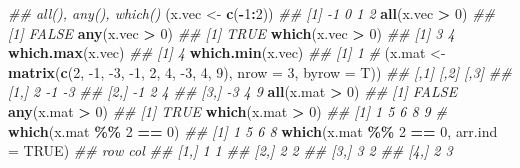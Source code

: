 \documentclass[
]{book}
\newenvironment{Shaded}{\begin{snugshade}}{\end{snugshade}}
\newcommand{\CommentTok}[1]{\textcolor[rgb]{0.56,0.35,0.01}{\textit{#1}}}
\newcommand{\DataTypeTok}[1]{\textcolor[rgb]{0.13,0.29,0.53}{#1}}
\newcommand{\DecValTok}[1]{\textcolor[rgb]{0.00,0.00,0.81}{#1}}
\newcommand{\KeywordTok}[1]{\textcolor[rgb]{0.13,0.29,0.53}{\textbf{#1}}}
\newcommand{\NormalTok}[1]{#1}
\newcommand{\OperatorTok}[1]{\textcolor[rgb]{0.81,0.36,0.00}{\textbf{#1}}}
\newcommand{\OtherTok}[1]{\textcolor[rgb]{0.56,0.35,0.01}{#1}}
\newcommand{\StringTok}[1]{\textcolor[rgb]{0.31,0.60,0.02}{#1}}
\begin{document}
\begin{Shaded}
\begin{Highlighting}[]
\CommentTok{\#\# all(), any(), which()}
\NormalTok{(x.vec \textless{}{-}}\StringTok{ }\KeywordTok{c}\NormalTok{(}\OperatorTok{{-}}\DecValTok{1}\OperatorTok{:}\DecValTok{2}\NormalTok{))}
\CommentTok{\#\# [1] {-}1  0  1  2}
\KeywordTok{all}\NormalTok{(x.vec }\OperatorTok{\textgreater{}}\StringTok{ }\DecValTok{0}\NormalTok{)}
\CommentTok{\#\# [1] FALSE}
\KeywordTok{any}\NormalTok{(x.vec }\OperatorTok{\textgreater{}}\StringTok{ }\DecValTok{0}\NormalTok{)}
\CommentTok{\#\# [1] TRUE}
\KeywordTok{which}\NormalTok{(x.vec }\OperatorTok{\textgreater{}}\StringTok{ }\DecValTok{0}\NormalTok{)}
\CommentTok{\#\# [1] 3 4}
\KeywordTok{which.max}\NormalTok{(x.vec)}
\CommentTok{\#\# [1] 4}
\KeywordTok{which.min}\NormalTok{(x.vec)}
\CommentTok{\#\# [1] 1}
\CommentTok{\#}
\NormalTok{(x.mat \textless{}{-}}\StringTok{ }\KeywordTok{matrix}\NormalTok{(}\KeywordTok{c}\NormalTok{(}\DecValTok{2}\NormalTok{, }\DecValTok{{-}1}\NormalTok{, }\DecValTok{{-}3}\NormalTok{,}
                   \DecValTok{{-}1}\NormalTok{,  }\DecValTok{2}\NormalTok{,  }\DecValTok{4}\NormalTok{,}
                   \DecValTok{{-}3}\NormalTok{,  }\DecValTok{4}\NormalTok{,  }\DecValTok{9}\NormalTok{),}
                 \DataTypeTok{nrow =} \DecValTok{3}\NormalTok{, }\DataTypeTok{byrow =}\NormalTok{ T))}
\CommentTok{\#\#      [,1] [,2] [,3]}
\CommentTok{\#\# [1,]    2   {-}1   {-}3}
\CommentTok{\#\# [2,]   {-}1    2    4}
\CommentTok{\#\# [3,]   {-}3    4    9}
\KeywordTok{all}\NormalTok{(x.mat }\OperatorTok{\textgreater{}}\StringTok{ }\DecValTok{0}\NormalTok{)}
\CommentTok{\#\# [1] FALSE}
\KeywordTok{any}\NormalTok{(x.mat }\OperatorTok{\textgreater{}}\StringTok{ }\DecValTok{0}\NormalTok{)}
\CommentTok{\#\# [1] TRUE}
\KeywordTok{which}\NormalTok{(x.mat }\OperatorTok{\textgreater{}}\StringTok{ }\DecValTok{0}\NormalTok{)}
\CommentTok{\#\# [1] 1 5 6 8 9}
\CommentTok{\#}
\KeywordTok{which}\NormalTok{(x.mat }\OperatorTok{\%\%}\StringTok{ }\DecValTok{2} \OperatorTok{==}\StringTok{ }\DecValTok{0}\NormalTok{)}
\CommentTok{\#\# [1] 1 5 6 8}
\KeywordTok{which}\NormalTok{(x.mat }\OperatorTok{\%\%}\StringTok{ }\DecValTok{2} \OperatorTok{==}\StringTok{ }\DecValTok{0}\NormalTok{, }\DataTypeTok{arr.ind =} \OtherTok{TRUE}\NormalTok{)}
\CommentTok{\#\#      row col}
\CommentTok{\#\# [1,]   1   1}
\CommentTok{\#\# [2,]   2   2}
\CommentTok{\#\# [3,]   3   2}
\CommentTok{\#\# [4,]   2   3}
\end{Highlighting}
\end{Shaded}
\end{document}

